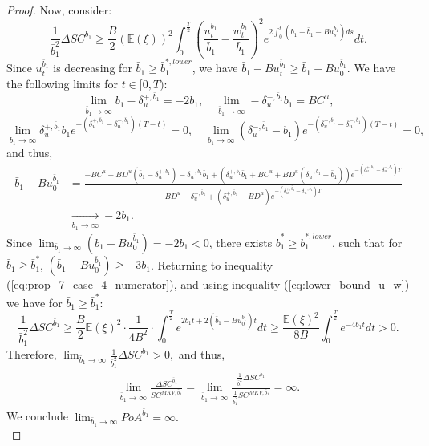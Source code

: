 \documentclass[11pt]{article}
\begin{document}
\begin{proof}
	Now, consider:
	\begin{equation}
	\frac{1}{\bar{b}_1^2}\Delta SC^{\bar{b}_1}\geq \frac{B}{2}(\mathbb{E}(\xi))^2\int_{0}^{\frac{T}{2}} \left(\frac{u_t^{\bar{b}_1}}{\bar{b}_1} - \frac{w_t^{\bar{b}_1}}{\bar{b}_1}\right)^2 e^{2\int_0^t (b_1+\bar{b}_1-B u_s^{\bar{b}_1})ds} dt.
	\label{eq:prop_7_case_4_numerator}
	\end{equation}
	Since $u^{\bar{b}_1}_t$ is decreasing for $\bar{b}_1 \geq \bar{b}_1^{*,lower}$, we have $\bar{b}_1-B u_t^{\bar{b}_1} \geq \bar{b}_1-B u_0^{\bar{b}_1}$. We have the following limits for $t\in[0,T)$:
	\begin{equation*}
	\lim_{\bar{b}_1 \to \infty}\bar{b}_1-\delta^{+,\bar{b}_1}_u=-2b_1, \quad \lim_{\bar{b}_1 \to \infty}-\delta^{-,\bar{b}_1}_u\bar{b}_1=BC^u,
	\end{equation*}
	\begin{equation*}
	\lim_{\bar{b}_1 \to \infty}\delta^{+,\bar{b}_1}_u\bar{b}_1e^{-(\delta^{+,\bar{b}_1}_u-\delta^{-,\bar{b}_1}_u)(T-t)}=0, \quad \lim_{\bar{b}_1 \to \infty}(\delta^{-,\bar{b}_1}_u-\bar{b}_1)e^{-(\delta^{+,\bar{b}_1}_u-\delta^{-,\bar{b}_1}_u)(T-t)}=0,
	\end{equation*}
	and thus,
	\begin{equation*}
	\begin{split}
	\bar{b}_1-Bu^{\bar{b}_1}_0&=\frac{-BC^u+BD^u(\bar{b}_1-\delta^{+,\bar{b}_1}_u)-\delta^{-,\bar{b}_1}_u\bar{b}_1+(\delta^{+,\bar{b}_1}_u\bar{b}_1+BC^u+BD^u(\delta^{-,\bar{b}_1}_u-\bar{b}_1))e^{-(\delta^{+,\bar{b}_1}_u-\delta^{-,\bar{b}_1}_u)T}}{BD^u-\delta^{-,\bar{b}_1}_u+(\delta^{+,\bar{b}_1}_u-BD^u) e^{-(\delta^{+,\bar{b}_1}_u-\delta^{-,\bar{b}_1}_u)T}} \\
	&\xrightarrow[\bar{b}_1 \to \infty]{} -2b_1 .
	\end{split}
	\end{equation*}
	Since $\lim_{\bar{b}_1 \to \infty}(\bar{b}_1-B u_0^{\bar{b}_1}) = -2b_1 < 0$, there exists $\bar{b}_1^{*}\geq\bar{b}_1^{*,lower}$, such that for $\bar{b}_1 \geq \bar{b}_1^{*}$, $(\bar{b}_1-B u_0^{\bar{b}_1}) \geq -3b_1$. Returning to inequality (\ref{eq:prop_7_case_4_numerator}), and using inequality (\ref{eq:lower_bound_u_w}) we have for $\bar{b}_1 \geq \bar{b}^*_1$:
	\begin{equation*}
	\frac{1}{\bar{b}_1^2}\Delta SC^{\bar{b}_1}
	\geq \frac{B}{2}\mathbb{E}(\xi)^2 \cdot \frac{1}{4B^2} \cdot \int_{0}^{\frac{T}{2}} e^{2b_1 t + 2(\bar{b}_1 - B u_0^{\bar{b}_1}) t } dt \geq \frac{\mathbb{E}(\xi)^2}{8 B} \int_0^{\frac{T}{2}} e^{-4b_1 t} dt  > 0.
	\end{equation*}
	Therefore,
	$
	\lim_{\bar{b}_1 \to \infty}\frac{1}{\bar{b}_1^2}\Delta SC^{\bar{b}_1}>0,
	$
	and thus,
	\begin{equation*}
	\begin{split}
	\lim_{\bar{b}_1 \to \infty}\frac{\Delta SC^{\bar{b}_1}}{SC^{MKV,\bar{b}_1}}=\lim_{\bar{b}_1 \to \infty}\frac{\frac{1}{\bar{b}_1^2}\Delta SC^{\bar{b}_1}}{\frac{1}{\bar{b}_1^2}SC^{MKV,\bar{b}_1}}=\infty.
	\end{split}
	\end{equation*}
	We conclude $\lim_{\bar{b}_1 \to \infty} PoA^{\bar{b}_1}=\infty.$\\


\end{proof}
\end{document}
